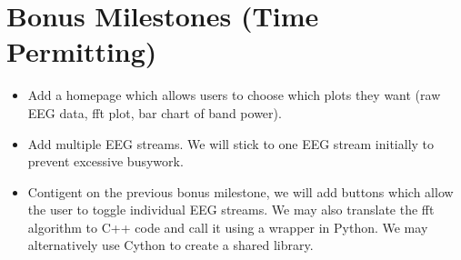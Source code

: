 \documentclass{article}
\begin{document}
\section*{Bonus Milestones (Time Permitting)}
\begin{itemize}
    \item Add a homepage which allows users to choose which plots they want (raw EEG data, fft plot, bar chart of band power).
    \item Add multiple EEG streams. We will stick to one EEG stream initially to prevent excessive busywork.
    \item Contigent on the previous bonus milestone, we will add buttons which allow the user to toggle individual EEG streams. We may also translate the fft algorithm to C++ code and call it using a wrapper in Python. We may alternatively use Cython to create a shared library.
\end{itemize}
\end{document}
